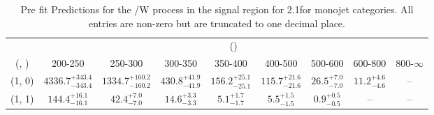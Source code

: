 \begin{table}[h!]
\tiny
\centering
\caption{Pre fit Predictions for the \ttbar/W process in the signal region for 2.1\ifb for monojet categories. All entries are non-zero but are truncated to one decimal place.\label{tab:predsep_sig_ttw_mono}}
\begin{tabular}
{ccccccccc}
	\hline\hline
	& \multicolumn{8}{c}{\scalht (\gev)} \\ 
	 (\njet,  \nb) & 200-250 & 250-300 & 300-350 & 350-400 & 400-500 & 500-600 & 600-800 & 800-$\infty$ \\ [0.8ex] 
\hline
	(1, 0) & $4336.7^{+ 343.4 }_{- 343.4 }$ & $1334.7^{+ 160.2 }_{- 160.2 }$ & $430.8^{+ 41.9 }_{- 41.9 }$ & $156.2^{+ 25.1 }_{- 25.1 }$ & $115.7^{+ 21.6 }_{- 21.6 }$ & $26.5^{+ 7.0 }_{- 7.0 }$ & $11.2^{+ 4.6 }_{- 4.6 }$ & -- \\[0.5ex] 
	(1, 1) & $144.4^{+ 16.1 }_{- 16.1 }$ & $42.4^{+ 7.0 }_{- 7.0 }$ & $14.6^{+ 3.3 }_{- 3.3 }$ & $5.1^{+ 1.7 }_{- 1.7 }$ & $5.5^{+ 1.5 }_{- 1.5 }$ & $0.9^{+ 0.5 }_{- 0.5 }$ & -- & -- \\[0.5ex] 
	\hline
	\hline
\end{tabular}
\end{table}
